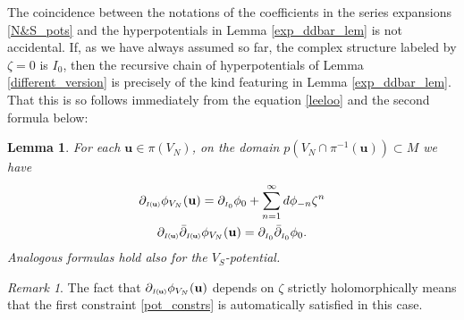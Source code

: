 \documentclass[11pt]{amsart}
\newtheorem{lemma}[theorem]{Lemma}
\theoremstyle{remark}
\newtheorem*{remark}{Remark}
\theoremstyle{remark}
\theoremstyle{definition}
\theoremstyle{definition}
\theoremstyle{definition}
\newcommand{\Iu}{\scriptscriptstyle{I\nhp(\nhp\mathbf{u}\hspace{-0.25pt})}} %
\newcommand{\Io}{{\scriptscriptstyle I_0}}
\newcommand{\0}{{\scriptstyle 0'}} %
\newcommand{\1}{{\scriptstyle 1'}}
\newcommand{\nhp}{\hspace{-0.5pt}} %
\begin{document}
The coincidence between the notations of the coefficients in the series expansions \eqref{N&S_pots} and the hyperpotentials in Lemma \ref{exp_ddbar_lem} is not accidental. If, as we have always assumed so far, the complex structure labeled by \mbox{$\zeta = 0$} is $I_0$, then the recursive chain of hyperpotentials of Lemma \ref{different_version} is precisely of the kind featuring in Lemma \ref{exp_ddbar_lem}. That this is so follows immediately from the equation \eqref{leeloo} and the second formula below:

\begin{lemma}
For each $\mathbf{u} \in \pi(V_N)$, on the domain $p(V_N \cap \pi^{-1}(\mathbf{u})) \subset M$ we have
\begin{gather} 
\partial_{\Iu} \phi_{V_N}(\mathbf{u}) = \partial_{\Io} \phi_0 + \sum_{n=1}^{\infty} d \phi_{-n} \zeta^n \label{delphi_at_u} \\ 
\partial_{\Iu}\bar{\partial}_{\Iu} \phi_{V_N}(\mathbf{u}) = \partial_{\Io}\bar{\partial}_{\Io} \phi_0. \label{hyper-pots}
\end{gather}
Analogous formulas hold also for the $V_S$-potential. 
\end{lemma}

\begin{remark}
The fact that $\partial_{\Iu}\phi_{V_N}(\mathbf{u})$ depends on $\zeta$ strictly holomorphically means that the first constraint \eqref{pot_constrs} is automatically satisfied in this case.
\end{remark}
\end{document}
